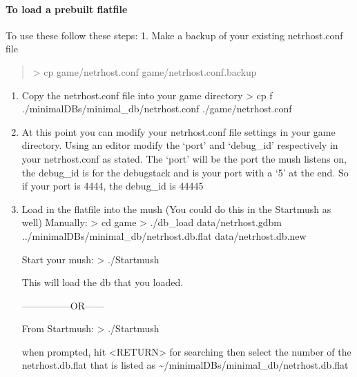 \documentclass[letterpaper,10pt,english]{sphinxmanual}
\begin{document}
\paragraph{To load a prebuilt flatfile}
\label{\detokenize{installation:to-load-a-prebuilt-flatfile}}
\sphinxAtStartPar
To use these follow these steps:
1.  Make a backup of your existing netrhost.conf file
\begin{quote}

\sphinxAtStartPar
\textendash{}\textgreater{} cp game/netrhost.conf game/netrhost.conf.backup
\end{quote}
\begin{enumerate}
%
\setcounter{enumi}{1}
\item {} 
\sphinxAtStartPar
Copy the netrhost.conf file into your game directory
\textendash{}\textgreater{} cp \sphinxhyphen{}f ./minimal\sphinxhyphen{}DBs/minimal\_db/netrhost.conf ./game/netrhost.conf

\item {} 
\sphinxAtStartPar
At this point you can modify your netrhost.conf file settings in your game directory.
Using an editor modify the ‘port’ and ‘debug\_id’ respectively in your netrhost.conf as stated.
The ‘port’ will be the port the mush listens on, the debug\_id is for the debug\sphinxhyphen{}stack and is
your port with a ‘5’ at the end.  So if your port is 4444, the debug\_id is 44445

\item {} 
\sphinxAtStartPar
Load in the flatfile into the mush (You could do this in the Startmush as well)
Manually:
\textendash{}\textgreater{} cd game
\textendash{}\textgreater{} ./db\_load data/netrhost.gdbm ../minimal\sphinxhyphen{}DBs/minimal\_db/netrhost.db.flat data/netrhost.db.new

\sphinxAtStartPar
Start your mush:
\textendash{}\textgreater{} ./Startmush

\sphinxAtStartPar
This will load the db that you loaded.

\sphinxAtStartPar
—————OR——\sphinxhyphen{}

\sphinxAtStartPar
From Startmush:
\textendash{}\textgreater{} ./Startmush

\sphinxAtStartPar
when prompted, hit \textless{}RETURN\textgreater{} for searching then select the number of the netrhost.db.flat that is
listed as \textasciitilde{}/minimal\sphinxhyphen{}DBs/minimal\_db/netrhost.db.flat

\end{enumerate}
\end{document}
